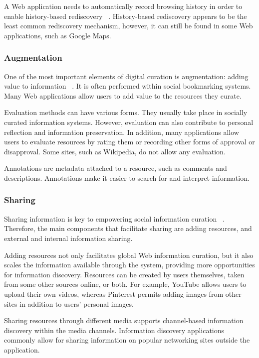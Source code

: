 {{{A Web application needs to automatically record browsing history in order to enable history-based rediscovery ~\cite{tauscher}. History-based rediscovery appears to be the least common rediscovery mechanism, however, it can still be found in some Web applications, such as Google Maps.
} %

{\subsubsection{Augmentation}
One of the most important elements of digital curation is augmentation: adding value to information ~\cite{beagrie, wittaker}. It is often performed within social bookmarking systems. Many Web applications allow users to add value to the resources they curate. 

Evaluation methods can have various forms. They usually take place in socially curated information systems. However, evaluation can also contribute to personal reflection and information preservation. In addition, many applications allow users to evaluate resources by rating them or recording other forms of approval or disapproval. Some sites, such as Wikipedia, do not allow any evaluation. 

Annotations are metadata attached to a resource, such as comments and descriptions. Annotations make it easier to search for and interpret information. 
} %

{\subsubsection{Sharing}
Sharing information is key to empowering social information curation ~\cite{beagrie}. Therefore, the main components that facilitate sharing are adding resources, and external and internal information sharing.

Adding resources not only facilitates global Web information curation, but it also scales the information available through the system, providing more opportunities for information discovery. Resources can be created by users themselves, taken from some other sources online, or both. For example, YouTube allows users to upload their own videos, whereas Pinterest permits adding images from other sites in addition to users' personal images. 

Sharing resources through different media supports channel-based information discovery within the media channels. Information discovery applications commonly allow for sharing information on popular networking sites outside the application.

}}}
